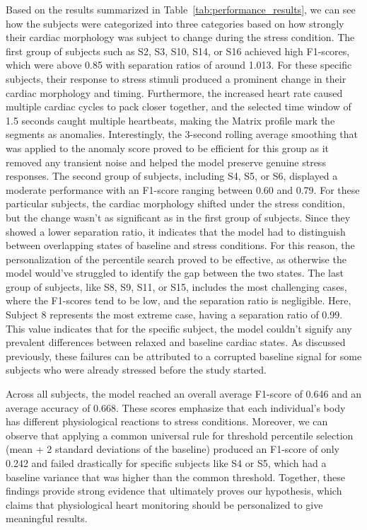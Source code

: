 \documentclass[conference,10pt]{IEEEtran}
\begin{document}
Based on the results summarized in Table~\ref{tab:performance_results}, we can see how the subjects were categorized into three categories based on how strongly their cardiac morphology was subject to change during the stress condition. 
The first group of subjects such as S2, S3, S10, S14, or S16 achieved high F1-scores, which were above 0.85 with separation ratios of around 1.013.  For these specific subjects, their response to stress stimuli produced a prominent change in their cardiac morphology and timing. Furthermore, the increased heart rate caused multiple cardiac cycles to pack closer together, and the selected time window of 1.5 seconds caught multiple heartbeats, making the Matrix profile mark the segments as anomalies. Interestingly, the 3-second rolling average smoothing that was applied to the anomaly score proved to be efficient for this group as it removed any transient noise and helped the model preserve genuine stress responses. 
The second group of subjects, including S4, S5, or S6, displayed a moderate performance with an F1-score ranging between 0.60 and 0.79. For these particular subjects, the cardiac morphology shifted under the stress condition, but the change wasn’t as significant as in the first group of subjects. Since they showed a lower separation ratio, it indicates that the model had to distinguish between overlapping states of baseline and stress conditions. For this reason, the personalization of the percentile search proved to be effective, as otherwise the model would’ve struggled to identify the gap between the two states. 
The last group of subjects, like S8, S9, S11, or S15, includes the most challenging cases, where the F1-scores tend to be low, and the separation ratio is negligible. Here, Subject 8 represents the most extreme case, having a separation ratio of 0.99. This value indicates that for the specific subject, the model couldn’t signify any prevalent differences between relaxed and baseline cardiac states. As discussed previously, these failures can be attributed to a corrupted baseline signal for some subjects who were already stressed before the study started. 

Across all subjects, the model reached an overall average F1-score of 0.646 and an average accuracy of 0.668. These scores emphasize that each individual’s body has different physiological reactions to stress conditions. Moreover, we can observe that applying a common universal rule for threshold percentile selection (mean + 2 standard deviations of the baseline) produced an F1-score of only 0.242 and failed drastically for specific subjects like S4 or S5, which had a baseline variance that was higher than the common threshold. Together, these findings provide strong evidence that ultimately proves our hypothesis, which claims that physiological heart monitoring should be personalized to give meaningful results.
\end{document}
